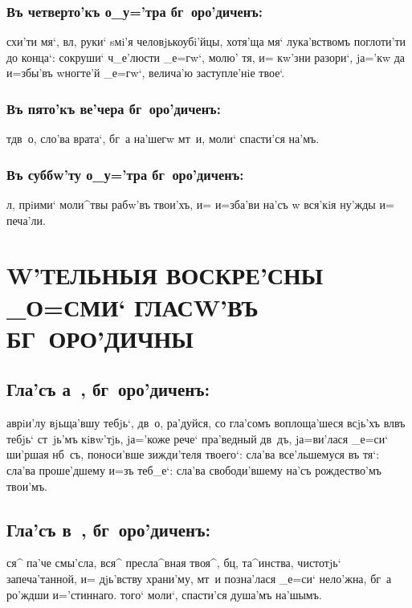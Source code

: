 \documentclass[14pt,twoside]{extreport}
\renewcommand{\*}{~~\raise3pt\hbox{\footnotesize*}}
\begin{document}
\subsubsection{Въ четверто'къ о_у='тра бг~оро'диченъ:}

схи'ти мя`, вл, руки` sмi'я человjькоубi'йцы, хотя'ща мя`
лу\-ка'в\-ст\-вомъ поглоти'ти до конца`: сокруши` ч_е'люсти _е=гw`, молю' тя, и=
кw'зни разори`, jа='кw да и=збы'въ w\т ногте'й _е=гw`, велича'ю заступле'нiе твое`.

\subsubsection{Въ пято'къ ве'чера бг~оро'диченъ:}

т дв~о, сло'ва врата`, бг~а на'шегw мт~и, моли` спасти'ся на'мъ.

\subsubsection{Въ суббw'ту о_у='тра бг~оро'диченъ:}

л, прiими` моли^твы рабw'въ твои'хъ, и= и=зба'ви на'съ w\т
вся'кiя ну'жды и= печа'ли.

\csendpict
\clearpage
\hdrcrosspage

\section[W\тпусти'тельныя воскре'сны _о=сми` гласw'въ
бг~оро'дичны]{\MakeUppercase{W'тельныя воскре'сны _о=сми` гласw'въ
    бг~оро'дичны}}

\subsection{Гла'съ а~, бг~оро'диченъ:}

аврiи'лу вjьща'вшу тебjь`, дв~о, ра'дуйся, со гла'сомъ воплоща'шеся
всjь'хъ вл въ тебjь` ст~jь'мъ кiвw'тjь, jа='коже рече` пра'ведный дв~дъ,
jа=ви'лася _е=си` ши'ршая нб~съ, поноси'вше зижди'теля твоего`: сла'ва
все'льшемуся въ тя`: сла'ва про\-ше'д\-ше\-му и=зъ теб_е`: сла'ва свободи'вшему
на'съ рождество'мъ твои'мъ.

\subsection{Гла'съ в~, бг~оро'диченъ:}

ся^ па'че смы'сла, вся^ пресла^вная твоя^, бц, та^инства, чистотjь`
запеча'танной, и= дjь'вству храни'му, мт~и позна'лася _е=си` нело'жна, бг~а
ро'ждши и='стиннаго. того` моли`, спасти'ся душа'мъ на'шымъ.
\end{document}
